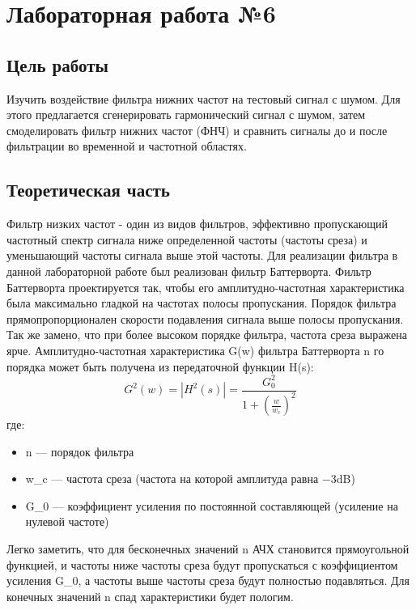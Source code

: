 \documentclass[10pt,a4paper]{report}
\begin{document}
\chapter{Лабораторная работа №6}
\section{Цель работы}
Изучить воздействие фильтра нижних частот на тестовый сигнал с шумом. Для этого предлагается сгенерировать гармонический сигнал с шумом, затем смоделировать фильтр нижних частот (ФНЧ) и сравнить сигналы до и после фильтрации во временной и частотной областях.
\section{Теоретическая часть}
Фильтр низких частот - один из видов фильтров, эффективно пропускающий частотный спектр сигнала ниже определенной частоты (частоты среза) и уменьшающий частоты сигнала выше этой частоты. Для реализации фильтра в данной лабораторной работе был реализован фильтр Баттерворта. Фильтр Баттерворта проектируется так, чтобы его амплитудно-частотная характеристика была максимально гладкой на частотах полосы пропускания. Порядок фильтра прямопропорционален скорости подавления сигнала выше полосы пропускания. Так же замено, что при более высоком порядке фильтра, частота среза выражена ярче. Амплитудно-частотная характеристика G(w) фильтра Баттерворта n го порядка может быть получена из передаточной функции H(s):
\begin{displaymath}
	G^2(w) = |H^2(s)| = \frac{G_0^2}{1+(\frac{w}{w_c})^2}
\end{displaymath}
где:
\begin{itemize}
\item n — порядок фильтра
\item w_c — частота среза (частота на которой амплитуда равна −3dB)
\item G_0 — коэффициент усиления по постоянной составляющей (усиление на нулевой частоте)
\end{itemize}
Легко заметить, что для бесконечных значений n АЧХ становится прямоугольной функцией, и частоты ниже частоты среза будут пропускаться с коэффициентом усиления G_0, а частоты выше частоты среза будут полностью подавляться. Для конечных значений n спад характеристики будет пологим.
\end{document}
